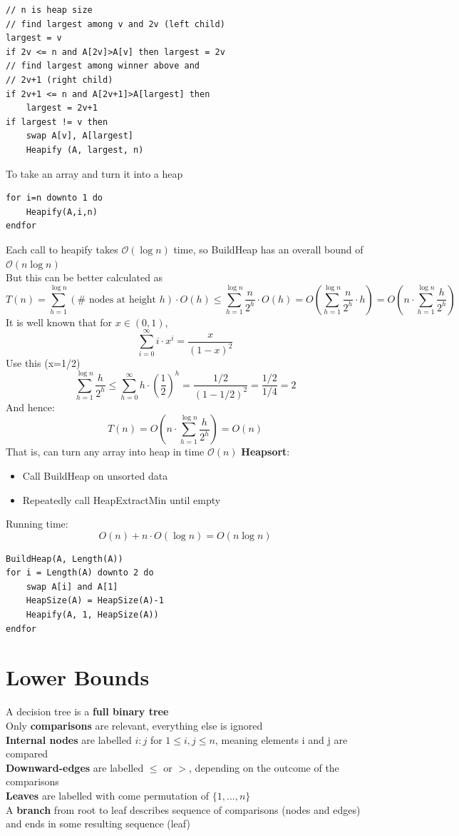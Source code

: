 \documentclass{article}[18pt]
\begin{document}
\begin{lstlisting}[caption={Heapify(A,v,n)}]
// n is heap size
// find largest among v and 2v (left child)
largest = v
if 2v <= n and A[2v]>A[v] then largest = 2v
// find largest among winner above and
// 2v+1 (right child)
if 2v+1 <= n and A[2v+1]>A[largest] then
	largest = 2v+1
if largest != v then
	swap A[v], A[largest]
	Heapify (A, largest, n)
\end{lstlisting}
To take an array and turn it into a heap
\begin{lstlisting}[caption={BuildHeap(A,n)}]
for i=n downto 1 do
	Heapify(A,i,n)
endfor
\end{lstlisting}
Each call to heapify takes $\mathcal{O}(\log n)$ time, so BuildHeap has an overall bound of $\mathcal{O}(n\log n)$\\
But this can be better calculated as
$$T ( n ) = \sum _ { h = 1 } ^ { \log n } ( \# \text { nodes at height } h ) \cdot O ( h ) \leq \sum _ { h = 1 } ^ { \log n } \frac { n } { 2 ^ { h } } \cdot O ( h ) = O \left( \sum _ { h = 1 } ^ { \log n } \frac { n } { 2 ^ { h } } \cdot h \right) = O \left( n \cdot \sum _ { h = 1 } ^ { \log n } \frac { h } { 2 ^ { h } } \right)$$
It is well known that for $x\in (0,1)$,
$$\sum _ { i = 0 } ^ { \infty } i \cdot x ^ { i } = \frac { x } { ( 1 - x ) ^ { 2 } }$$
Use this (x=1/2)
$$\sum _ { h = 1 } ^ { \log n } \frac { h } { 2 ^ { h } } \leq \sum _ { h = 0 } ^ { \infty } h \cdot \left( \frac { 1 } { 2 } \right) ^ { h }	= \frac { 1 / 2 } { ( 1 - 1 / 2 ) ^ { 2 } } = \frac { 1 / 2 } { 1 / 4 } = 2$$
And hence:
$$T ( n ) = O \left( n \cdot \sum _ { h = 1 } ^ { \log n } \frac { h } { 2 ^ { h } } \right) = O ( n )$$
That is, can turn any array into heap in time $\mathcal{O}(n)$
\textbf{Heapsort}:
\begin{itemize}
	\item Call BuildHeap on unsorted data
	\item Repeatedly call HeapExtractMin until empty
\end{itemize}
Running time:
\[
O(n)+n \cdot O(\log n)=O(n \log n)
\]
\begin{lstlisting}[caption=HeapSort(A)]
BuildHeap(A, Length(A))
for i = Length(A) downto 2 do
	swap A[i] and A[1]
	HeapSize(A) = HeapSize(A)-1
	Heapify(A, 1, HeapSize(A))
endfor
\end{lstlisting}
\section{Lower Bounds}
A decision tree is a \textbf{full binary tree}\\
Only \textbf{comparisons} are relevant, everything else is ignored\\
\textbf{Internal nodes} are labelled $i:j$ for $1\leqslant i,j \leqslant n$, meaning elements i and j are compared\\
\textbf{Downward-edges} are labelled $\leqslant$ or $>$, depending on the outcome of the comparisons\\
\textbf{Leaves} are labelled with come permutation of $\{1,...,n\}$\\
A \textbf{branch} from root to leaf describes sequence of comparisons (nodes and edges) and ends in some resulting sequence (leaf)
\end{document}
